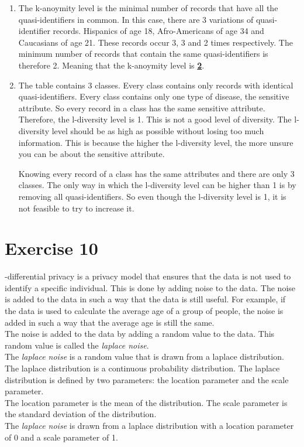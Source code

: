 \documentclass[twoside, a4paper, fleqn, reqno]{article}
\begin{document}
\begin{enumerate}
	\item The k-anoymity level is the minimal number of records that have all the quasi-identifiers in common.
	In this case, there are 3 variations of quasi-identifier records. Hispanics of age 18,
	Afro-Americans of age 34 and Caucasians of age 21.
	These records occur 3, 3 and 2 times respectively. The minimum
	number of records that contain the same quasi-identifiers is therefore 2. Meaning that the k-anoymity level
	is \textbf{\underline{2}}.\\
	\item The table contains 3 classes. Every class contains only records with identical quasi-identifiers.
	Every class contains only one type of disease, the sensitive attribute. So every record
	in a class has the same sensitive attribute. Therefore, the l-diversity level is 1.
	This is not a good level of diversity. The l-diversity level should be as high as possible without
	losing too much information. This is because the higher the l-diversity level, the more unsure
	you can be about the sensitive attribute.

	Knowing every record of a class has the same attributes and there are only 3 classes.
	The only way in which the l-diversity level can be higher than 1 is by removing all quasi-identifiers.
	So even though the l-diversity level is 1, it is not feasible to try to increase it.
	
\end{enumerate}

\section*{Exercise 10}

\epsilon -differential privacy is a privacy model that ensures that the data is not used to identify a specific individual. This is done by adding noise to the data.
The noise is added to the data in such a way that the data is still useful.
For example, if the data is used to calculate the average age of a group of people, the noise is added in such a way that the average age is still the same.\\
The noise is added to the data by adding a random value to the data. This random value is called the \textit{laplace noise}.\\
The \textit{laplace noise} is a random value that is drawn from a laplace distribution. The laplace distribution is a continuous probability distribution.
The laplace distribution is defined by two parameters: the location parameter and the scale parameter.\\
The location parameter is the mean of the distribution. The scale parameter is the standard deviation of the distribution.\\
The \textit{laplace noise} is drawn from a laplace distribution with a location parameter of 0 and a scale parameter of 1.\\
\end{document}
